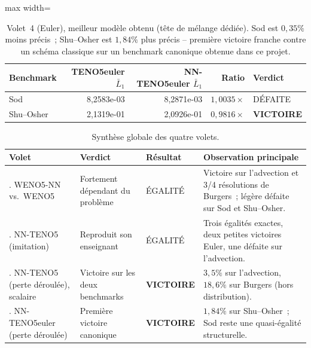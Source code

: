\documentclass[12pt,a4paper,oneside]{report}
\begin{document}
\begin{table}[H]
\centering
\begin{adjustbox}{max width=\textwidth}
\begin{tabular}{lrrrl}
\toprule
\textbf{Benchmark} & \textbf{TENO5euler $\bar L_1$} & \textbf{NN-TENO5euler $\bar L_1$} & \textbf{Ratio} & \textbf{Verdict} \\
\midrule
Sod & 8{,}2583e-03 & 8{,}2871e-03 & $1{,}0035\times$ & DÉFAITE \\
\rowrule
Shu--Osher & 2{,}1319e-01 & 2{,}0926e-01 & $0{,}9816\times$ & \textbf{VICTOIRE} \\
\bottomrule
\end{tabular}
\end{adjustbox}
\caption{Volet~4 (Euler), meilleur modèle obtenu (tête de mélange dédiée). Sod
est $0{,}35\%$ moins précis~; Shu--Osher est $1{,}84\%$ plus précis -- première
victoire franche contre un schéma classique sur un benchmark canonique obtenue
dans ce projet.}
\label{tab:volet4}
\end{table}

\begin{table}[H]
\centering
\small
\begin{tabularx}{\textwidth}{@{}>{\raggedright\arraybackslash}p{}>{\raggedright\arraybackslash}p{}>{\centering\arraybackslash}p{}>{\raggedright\arraybackslash}X@{}}
\toprule
\textbf{Volet} & \textbf{Verdict} & \textbf{Résultat} & \textbf{Observation principale} \\
\midrule
1. WENO5-NN vs.\ WENO5 & Fortement dépendant du problème & ÉGALITÉ & Victoire sur l'advection et 3/4 résolutions de Burgers~; légère défaite sur Sod et Shu--Osher. \\
\rowrule
2. NN-TENO5 (imitation) & Reproduit son enseignant & ÉGALITÉ & Trois égalités exactes, deux petites victoires Euler, une défaite sur l'advection. \\
\rowrule
3. NN-TENO5 (perte déroulée), scalaire & Victoire sur les deux benchmarks & \textbf{VICTOIRE} & $3{,}5\%$ sur l'advection, $18{,}6\%$ sur Burgers (hors distribution). \\
\rowrule
4. NN-TENO5euler (perte déroulée) & Première victoire canonique & \textbf{VICTOIRE} & $1{,}84\%$ sur Shu--Osher~; Sod reste une quasi-égalité structurelle. \\
\bottomrule
\end{tabularx}
\caption{Synthèse globale des quatre volets.}
\label{tab:synthese}
\end{table}
\end{document}

